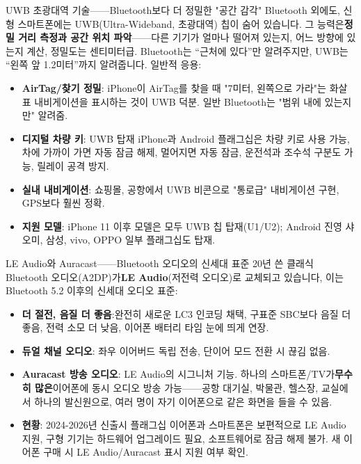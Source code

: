 \begin{tcbinfo}{UWB 초광대역 기술——Bluetooth보다 더 정밀한 "공간 감각"}
Bluetooth 외에도, 신형 스마트폰에는 UWB(Ultra-Wideband, 초광대역) 칩이 숨어 있습니다. 그 능력은\textbf{정밀 거리 측정과 공간 위치 파악}——다른 기기가 얼마나 떨어져 있는지, 어느 방향에 있는지 계산, 정밀도는 센티미터급. Bluetooth는 “근처에 있다”만 알려주지만, UWB는 “왼쪽 앞 1.2미터”까지 알려줍니다. 일반적 응용:

\begin{itemize}
  \item \textbf{AirTag/찾기 정밀}: iPhone이 AirTag를 찾을 때 "7미터, 왼쪽으로 가라"는 화살표 내비게이션을 표시하는 것이 UWB 덕분. 일반 Bluetooth는 "범위 내에 있는지만" 알려줌.
  \item \textbf{디지털 차량 키}: UWB 탑재 iPhone과 Android 플래그십은 차량 키로 사용 가능, 차에 가까이 가면 자동 잠금 해제, 멀어지면 자동 잠금, 운전석과 조수석 구분도 가능, 릴레이 공격 방지.
  \item \textbf{실내 내비게이션}: 쇼핑몰, 공항에서 UWB 비콘으로 "통로급" 내비게이션 구현, GPS보다 훨씬 정확.
  \item \textbf{지원 모델}: iPhone 11 이후 모델은 모두 UWB 칩 탑재(U1/U2); Android 진영 샤오미, 삼성, vivo, OPPO 일부 플래그십도 탑재.
\end{itemize}

\end{tcbinfo}

\begin{tcbinfo}{LE Audio와 Auracast——Bluetooth 오디오의 신세대 표준}
20년 쓴 클래식 Bluetooth 오디오(A2DP)가\textbf{LE Audio}(저전력 오디오)로 교체되고 있습니다, 이는 Bluetooth 5.2 이후의 신세대 오디오 표준:

\begin{itemize}
  \item \textbf{더 절전, 음질 더 좋음}:완전히 새로운 LC3 인코딩 채택, 구표준 SBC보다 음질 더 좋음, 전력 소모 더 낮음, 이어폰 배터리 타임 눈에 띄게 연장.
  \item \textbf{듀얼 채널 오디오}: 좌우 이어버드 독립 전송, 단이어 모드 전환 시 끊김 없음.
  \item \textbf{Auracast 방송 오디오}: LE Audio의 시그니처 기능. 하나의 스마트폰/TV가\textbf{무수히 많은}이어폰에 동시 오디오 방송 가능——공항 대기실, 박물관, 헬스장, 교실에서 하나의 발신원으로, 여러 명이 자기 이어폰으로 같은 화면을 들을 수 있음.
  \item \textbf{현황}: 2024-2026년 신출시 플래그십 이어폰과 스마트폰은 보편적으로 LE Audio 지원, 구형 기기는 하드웨어 업그레이드 필요, 소프트웨어로 잠금 해제 불가. 새 이어폰 구매 시 LE Audio/Auracast 표시 지원 여부 확인.
\end{itemize}

\end{tcbinfo}


